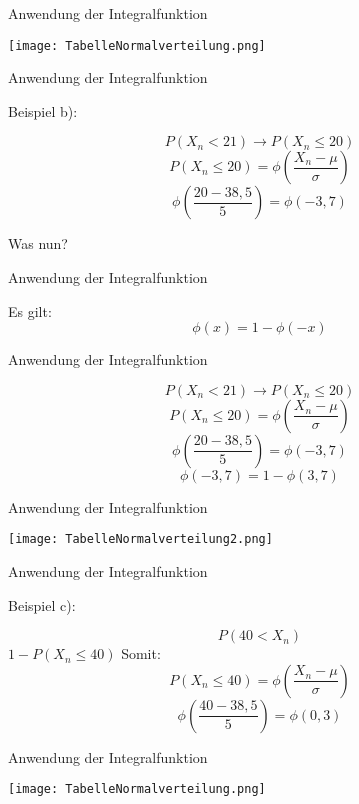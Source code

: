 \documentclass[14pt]{beamer}
\begin{document}
\begin{frame} {Anwendung der Integralfunktion}
 
 \texttt{[image: TabelleNormalverteilung.png]}

\end{frame}
\begin{frame} {Anwendung der Integralfunktion}

Beispiel b):
 
 $$P(X_n < 21) \rightarrow P(X_n \le 20)$$
 $$P(X_n \le 20) =  \phi\left(\frac{X_n - \mu}{\sigma}\right)$$
 $$ \phi\left(\frac{20 - 38,5}{5}\right) = \phi(-3,7) $$
 
 Was nun?

\end{frame}
\begin{frame} {Anwendung der Integralfunktion}
 
 Es gilt:
 $$ \phi(x) = 1 - \phi(-x) $$

\end{frame}

\begin{frame} {Anwendung der Integralfunktion}
 
 $$P(X_n < 21) \rightarrow P(X_n \le 20)$$
 $$P(X_n \le 20) =  \phi\left(\frac{X_n - \mu}{\sigma}\right)$$
 $$ \phi\left(\frac{20 - 38,5}{5}\right) = \phi(-3,7) $$
 $$ \phi(-3,7) = 1 - \phi(3,7)$$

\end{frame}

\begin{frame} {Anwendung der Integralfunktion}
 
 \texttt{[image: TabelleNormalverteilung2.png]}

\end{frame}

\begin{frame} {Anwendung der Integralfunktion}

Beispiel c):
 
 $$P(40 < X_n)$$
 $1 - P(X_n \le 40)$
 Somit: $$P(X_n \le 40) =  \phi\left(\frac{X_n - \mu}{\sigma}\right)$$
 $$ \phi\left(\frac{40 - 38,5}{5}\right) = \phi(0,3) $$

\end{frame}

\begin{frame} {Anwendung der Integralfunktion}
 
 \texttt{[image: TabelleNormalverteilung.png]}

\end{frame}
\end{document}
